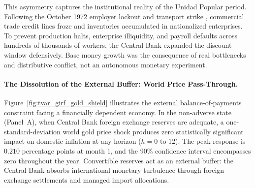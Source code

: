 This asymmetry captures the institutional reality of the Unidad Popular period. Following the October 1972 employer lockout and transport strike \citep{Casals2021}, commercial trade credit lines froze and inventories accumulated in nationalized enterprises. To prevent production halts, enterprise illiquidity, and payroll defaults across hundreds of thousands of workers, the Central Bank expanded the discount window defensively. Base money growth was the consequence of real bottlenecks and distributive conflict, not an autonomous monetary experiment.

\paragraph{The Dissolution of the External Buffer: World Price Pass-Through.}
Figure~\ref{fig:tvar_girf_gold_shield} illustrates the external balance-of-payments constraint facing a financially dependent economy. In the non-adverse state (Panel~A), when Central Bank foreign exchange reserves are adequate, a one-standard-deviation world gold price shock produces zero statistically significant impact on domestic inflation at any horizon ($h=0$ to $12$). The peak response is $0.210$ percentage points at month 1, and the 90\% confidence interval encompasses zero throughout the year. Convertible reserves act as an external buffer: the Central Bank absorbs international monetary turbulence through foreign exchange settlements and managed import allocations.

